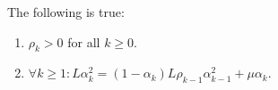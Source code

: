 \documentclass[12pt]{article}
\begin{document}
    \begin{observation}\label{obs:r-wapg-observation-1}
        The following is true: 
        \begin{enumerate}
            \item $\rho_k > 0$ for all $k \ge 0$. 
            \item $\forall k \ge 1: L\alpha_k^2 = (1 - \alpha_k)L\rho_{k - 1}\alpha_{k - 1}^2 +\mu\alpha_k$. 
        \end{enumerate}
        

\end{observation}
\end{document}
